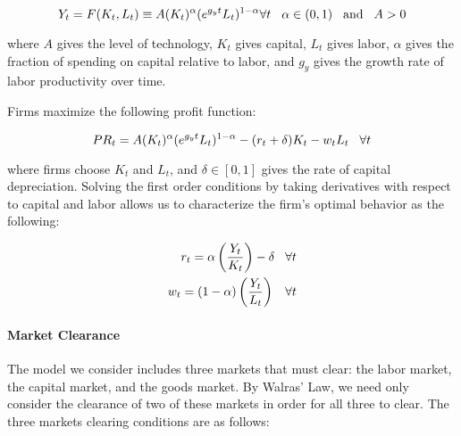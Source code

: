 \documentclass[10pt]{article}
\numberwithin{equation}{subsection}
\begin{document}
\begin{appendices}
\begin{equation}
   Y_t = F(K_t, L_t) \equiv A(K_t)^\alpha(e^{g_yt}L_t)^{1-\alpha} \forall t \hspace{3mm} \alpha \in (0, 1) \hspace{3mm} \text{and} \hspace{3mm} A>0
\end{equation}

\par where \(A\) gives the level of technology, \(K_t\) gives capital, \(L_t\) gives labor, \(\alpha\) gives the fraction of spending on capital relative to labor, and \(g_y\) gives the growth rate of labor productivity over time.

\par Firms maximize the following profit function:

\begin{equation}
   PR_t = A(K_t)^\alpha(e^{g_yt}L_t)^{1-\alpha} - (r_t + \delta)K_t - w_tL_t \hspace{3mm} \forall t
\end{equation}

\par where firms choose \(K_t\) and \(L_t\), and \(\delta \in [0, 1]\) gives the rate of capital depreciation. Solving the first order conditions by taking derivatives with respect to capital and labor allows us to characterize the firm's optimal behavior as the following:

\begin{align}
   r_t = \alpha\left(\frac{Y_t}{K_t}\right) - \delta \hspace{3mm} \forall t \\
   w_t = (1-\alpha)\left(\frac{Y_t}{L_t}\right)\hspace{3mm} \forall t
\end{align}


\paragraph{Market Clearance}

The model we consider includes three markets that must clear: the labor market, the capital market, and the goods market. By Walras' Law, we need only consider the clearance of two of these markets in order for all three to clear. The three markets clearing conditions are as follows:


\end{appendices}
\end{document}
